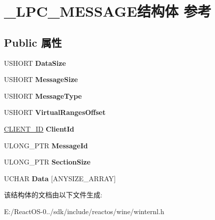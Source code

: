 \hypertarget{struct___l_p_c___m_e_s_s_a_g_e}{}\section{\+\_\+\+L\+P\+C\+\_\+\+M\+E\+S\+S\+A\+G\+E结构体 参考}
\label{struct___l_p_c___m_e_s_s_a_g_e}
\subsection*{Public 属性}
\begin{DoxyCompactItemize}
\item 
\mbox{\label{struct___l_p_c___m_e_s_s_a_g_e_a361fa03edc2ad457aee15c6413245c78}} 
U\+S\+H\+O\+RT {\bfseries Data\+Size}
\item 
\mbox{\label{struct___l_p_c___m_e_s_s_a_g_e_a405dcc5a2fea9e4700316d96e48851a4}} 
U\+S\+H\+O\+RT {\bfseries Message\+Size}
\item 
\mbox{\label{struct___l_p_c___m_e_s_s_a_g_e_a7ee7bd7156877df65781b2071162236d}} 
U\+S\+H\+O\+RT {\bfseries Message\+Type}
\item 
\mbox{\label{struct___l_p_c___m_e_s_s_a_g_e_a35609eef0f141af68e3d1e191304d607}} 
U\+S\+H\+O\+RT {\bfseries Virtual\+Ranges\+Offset}
\item 
\mbox{\label{struct___l_p_c___m_e_s_s_a_g_e_a563f4ed4dc25f17845a93b35f8660e51}} 
\hyperlink{struct___c_l_i_e_n_t___i_d}{C\+L\+I\+E\+N\+T\+\_\+\+ID} {\bfseries Client\+Id}
\item 
\mbox{\label{struct___l_p_c___m_e_s_s_a_g_e_af490522f74bae76c753f41a875a7e61b}} 
U\+L\+O\+N\+G\+\_\+\+P\+TR {\bfseries Message\+Id}
\item 
\mbox{\label{struct___l_p_c___m_e_s_s_a_g_e_a1565bd5fd4ead71a4ef28ef99100224d}} 
U\+L\+O\+N\+G\+\_\+\+P\+TR {\bfseries Section\+Size}
\item 
\mbox{\label{struct___l_p_c___m_e_s_s_a_g_e_a5fec2e36e97885bd83e714b436ca6722}} 
U\+C\+H\+AR {\bfseries Data} \mbox{[}A\+N\+Y\+S\+I\+Z\+E\+\_\+\+A\+R\+R\+AY\mbox{]}
\end{DoxyCompactItemize}


该结构体的文档由以下文件生成\+:\begin{DoxyCompactItemize}
\item 
E\+:/\+React\+O\+S-\/0../sdk/include/reactos/wine/winternl.\+h\end{DoxyCompactItemize}
